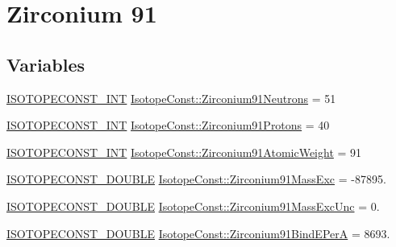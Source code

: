 \hypertarget{group___isotope_const-_zirconium-_zr91}{}\section{Zirconium 91}
\label{group___isotope_const-_zirconium-_zr91}
\subsection*{Variables}
\begin{DoxyCompactItemize}
\item 
\mbox{\hyperlink{group___isotope_const-_macros_ga5f18360b3e99483a35c32d789e62621c}{I\+S\+O\+T\+O\+P\+E\+C\+O\+N\+S\+T\+\_\+\+I\+NT}} \mbox{\hyperlink{group___isotope_const-_zirconium-_zr91_gabcca74c6a2f5a0a0450e366c1afd947c}{Isotope\+Const\+::\+Zirconium91\+Neutrons}} = 51
\item 
\mbox{\hyperlink{group___isotope_const-_macros_ga5f18360b3e99483a35c32d789e62621c}{I\+S\+O\+T\+O\+P\+E\+C\+O\+N\+S\+T\+\_\+\+I\+NT}} \mbox{\hyperlink{group___isotope_const-_zirconium-_zr91_ga418971594a587da2d0e749cd09c25f07}{Isotope\+Const\+::\+Zirconium91\+Protons}} = 40
\item 
\mbox{\hyperlink{group___isotope_const-_macros_ga5f18360b3e99483a35c32d789e62621c}{I\+S\+O\+T\+O\+P\+E\+C\+O\+N\+S\+T\+\_\+\+I\+NT}} \mbox{\hyperlink{group___isotope_const-_zirconium-_zr91_gaba6546f61a435aea51ebfd53f49c1f2a}{Isotope\+Const\+::\+Zirconium91\+Atomic\+Weight}} = 91
\item 
\mbox{\hyperlink{group___isotope_const-_macros_ga8f45a7272ce02c0b4c65c44636ed719a}{I\+S\+O\+T\+O\+P\+E\+C\+O\+N\+S\+T\+\_\+\+D\+O\+U\+B\+LE}} \mbox{\hyperlink{group___isotope_const-_zirconium-_zr91_gab5fcda4e2f2a50bb269673aff2ce85ae}{Isotope\+Const\+::\+Zirconium91\+Mass\+Exc}} = -\/87895.
\item 
\mbox{\hyperlink{group___isotope_const-_macros_ga8f45a7272ce02c0b4c65c44636ed719a}{I\+S\+O\+T\+O\+P\+E\+C\+O\+N\+S\+T\+\_\+\+D\+O\+U\+B\+LE}} \mbox{\hyperlink{group___isotope_const-_zirconium-_zr91_ga50bab22257807f440968180dac6db822}{Isotope\+Const\+::\+Zirconium91\+Mass\+Exc\+Unc}} = 0.
\item 
\mbox{\hyperlink{group___isotope_const-_macros_ga8f45a7272ce02c0b4c65c44636ed719a}{I\+S\+O\+T\+O\+P\+E\+C\+O\+N\+S\+T\+\_\+\+D\+O\+U\+B\+LE}} \mbox{\hyperlink{group___isotope_const-_zirconium-_zr91_ga5ffd2d5e1a2427b86c44445b006300bc}{Isotope\+Const\+::\+Zirconium91\+Bind\+E\+PerA}} = 8693.
\item 

\end{DoxyCompactItemize}
